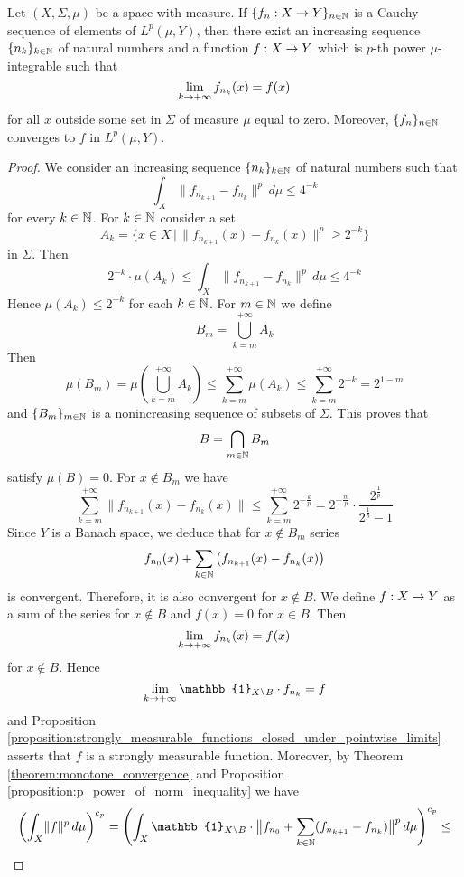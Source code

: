 \documentclass[10pt]{amsart}
\begin{document}
\begin{theorem}[Riesz]\label{theorem:riesz_theorem}
	Let $(X,\Sigma,\mu)$ be a space with measure. If $\{f_n:X\rightarrow Y\}_{n\in {\mathbb N}}$ is a Cauchy sequence of elements of $L^p(\mu,Y)$, then there exist an increasing sequence $\{n_k\}_{k\in {\mathbb N}}$ of natural numbers and a function $f:X\rightarrow Y$ which is $p$-th power $\mu$-integrable such that
	$$\lim_{k\rightarrow +\infty}f_{n_k}(x) = f(x)$$
	for all $x$ outside some set in $\Sigma$ of measure $\mu$ equal to zero. Moreover, $\{f_n\}_{n\in {\mathbb N}}$ converges to $f$ in $L^p(\mu,Y)$.
\end{theorem}
\begin{proof}
	We consider an increasing sequence $\{n_k\}_{k\in {\mathbb N}}$ of natural numbers such that
	$$\int_X\lVert f_{n_{k+1}} - f_{n_k}\rVert^p\,d\mu \leq 4^{-k}$$
	for every $k\in {\mathbb N}$. For $k\in {\mathbb N}$ consider a set
	$$A_k = \big\{x \in X\,\big|\,\lVert f_{n_{k+1}}(x) - f_{n_k}(x)\rVert^p \geq 2^{-k}\big\}$$
	in $\Sigma$. Then
	$$2^{-k} \cdot \mu(A_k)\leq \int_X\lVert f_{n_{k+1}}-f_{n_k}\rVert^p \,d\mu \leq 4^{-k}$$
	Hence $\mu(A_k)\leq 2^{-k}$ for each $k\in {\mathbb N}$. For $m\in {\mathbb N}$ we define
	$$B_m = \bigcup_{k=m}^{+\infty}A_k$$
	Then
	$$\mu(B_m) = \mu\left(\bigcup_{k=m}^{+\infty}A_k\right) \leq \sum_{k = m}^{+\infty}\mu(A_k) \leq \sum_{k=m}^{+\infty}2^{-k} = 2^{1 - m}$$
	and $\{B_m\}_{m\in {\mathbb N}}$ is a nonincreasing sequence of subsets of $\Sigma$. This proves that
	$$B = \bigcap_{m\in {\mathbb N}}B_m$$
	satisfy $\mu(B) = 0$. For $x\not \in B_m$ we have
	$$\sum_{k = m}^{+\infty}\lVert f_{n_{k+1}}(x) - f_{n_k}(x)\rVert \leq \sum_{k=m}^{+\infty}2^{-\frac{k}{p}} = 2^{-\frac{m}{p}}\cdot \frac{2^{\frac{1}{p}}}{2^{\frac{1}{p}} - 1}$$
	Since $Y$ is a Banach space, we deduce that for $x\not \in B_m$ series
	$$f_{n_0}(x) + \sum_{k\in {\mathbb N}}\left(f_{n_{k+1}}(x) - f_{n_k}(x)\right)$$
	is convergent. Therefore, it is also convergent for $x\not \in B$. We define $f:X\rightarrow Y$ as a sum of the series for $x\not \in B$ and $f(x) = 0$ for $x\in B$. Then
	$$\lim_{k\rightarrow +\infty}f_{n_k}(x) = f(x)$$
	for $x \not \in B$. Hence
	$$\lim_{k\ra +\infty}\mathbb{1}_{X\setminus B}\cdot f_{n_k} = f$$
	and Proposition \ref{proposition:strongly_measurable_functions_closed_under_pointwise_limits} asserts that $f$ is a strongly measurable function. Moreover, by Theorem \ref{theorem:monotone_convergence} and Proposition
	\ref{proposition:p_power_of_norm_inequality} we have
	$$\left(\int_X\lVert f\rVert^p \,d\mu\right)^{c_p} = \left(\int_X\mathbb{1}_{X\setminus B}\cdot \big \lVert f_{n_0} + \sum_{k\in \NN}(f_{n_{k+1}} - f_{n_k})\big \rVert^p \,d\mu \right)^{c_p} \leq$$

\end{proof}
\end{document}
